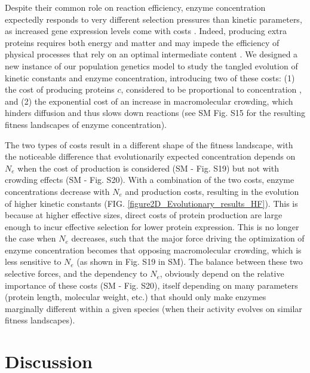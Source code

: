 \documentclass[11pt,onecolumn]{article}
\begin{document}
Despite their common role on reaction efficiency, enzyme concentration expectedly responds to very different selection pressures than kinetic parameters, as increased gene expression levels come with costs \citep{Wagner05,Lang09,ScottM10,Noor16,Kafri16}. Indeed, producing extra proteins requires both energy and matter \citep{Novick57,Stoebel08,Wagner05,Lynch15} and may impede the efficiency of physical processes that rely on an optimal intermediate content \citep{Dong95,Dill11,Andrews20}. We designed a new instance of our population genetics model to study the tangled evolution of kinetic constants and enzyme concentration, introducing two of these costs: (1) the cost of producing proteins $c$, considered to be proportional to concentration \citep{Wagner05,Chou14,Lynch15}, and (2) the exponential cost of an increase in macromolecular crowding, which hinders diffusion and thus slows down reactions \citep{Dill11,Schavemaker18,Andrews20} 
(see SM Fig. S15 for the resulting fitness landscapes of enzyme concentration).

The two types of costs result in a different shape of the fitness landscape, with the noticeable difference that evolutionarily expected concentration depends on $N_e$ when the cost of production is considered (SM - Fig. S19) but not with crowding effects (SM - Fig. S20). With a combination of the two costs, enzyme concentrations decrease with $N_e$ and production costs, resulting in the evolution of higher kinetic constants (FIG. \ref{figure2D_Evolutionary_results_HF}). This is because at higher effective sizes, direct costs of protein production are large enough to incur effective selection for lower protein expression. This is no longer the case when $N_e$ decreases, such that the major force driving the optimization of enzyme concentration becomes that opposing macromolecular crowding, which is less sensitive to $N_e$ (as shown in Fig. S19 in SM). The balance between these two selective forces, and the dependency to $N_e$, obviously depend on the relative importance of these costs (SM - Fig. S20), itself depending on many parameters (protein length, molecular weight, etc.) that should only make enzymes marginally different within a given species (when their activity evolves on similar fitness landscapes).

\section{Discussion\label{sec:Discussion}}
\end{document}

